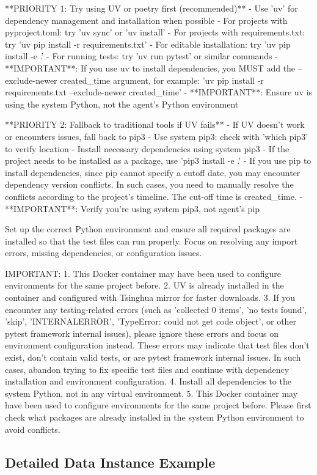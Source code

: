 \begin{tcblisting}
**PRIORITY 1: Try using UV or poetry first (recommended)**
- Use 'uv' for dependency management and installation when possible
- For projects with pyproject.toml: try 'uv sync' or 'uv install'
- For projects with requirements.txt: try 'uv pip install -r requirements.txt'
- For editable installation: try 'uv pip install -e .'
- For running tests: try 'uv run pytest' or similar commands
- **IMPORTANT**: If you use uv to install dependencies, you MUST add the --exclude-newer {created_time} argument, for example: 'uv pip install -r requirements.txt --exclude-newer {created_time}'
- **IMPORTANT**: Ensure uv is using the system Python, not the agent's Python environment

**PRIORITY 2: Fallback to traditional tools if UV fails**
- If UV doesn't work or encounters issues, fall back to pip3
- Use system pip3: check with 'which pip3' to verify location
- Install necessary dependencies using system pip3
- If the project needs to be installed as a package, use 'pip3 install -e .'
- If you use pip to install dependencies, since pip cannot specify a cutoff date, you may encounter dependency version conflicts. In such cases, you need to manually resolve the conflicts according to the project's timeline. The cut-off time is {created_time}.
- **IMPORTANT**: Verify you're using system pip3, not agent's pip

Set up the correct Python environment and ensure all required packages are installed so that the test files can run properly.
Focus on resolving any import errors, missing dependencies, or configuration issues.

IMPORTANT: 
1. This Docker container may have been used to configure environments for the same project before.
2. UV is already installed in the container and configured with Tsinghua mirror for faster downloads.
3. If you encounter any testing-related errors (such as 'collected 0 items', 'no tests found', 'skip', 'INTERNALERROR', 
'TypeError: could not get code object', or other pytest framework internal issues), please ignore these errors and focus 
on environment configuration instead. These errors may indicate that test files don't exist, don't contain valid tests, 
or are pytest framework internal issues. In such cases, abandon trying to fix specific test files and continue with 
dependency installation and environment configuration.
4. Install all dependencies to the system Python, not in any virtual environment.
5. This Docker container may have been used to configure environments for the same project before.
Please first check what packages are already installed in the system Python environment to avoid conflicts.
\end{tcblisting}

\newpage
\subsection{Detailed Data Instance Example}
